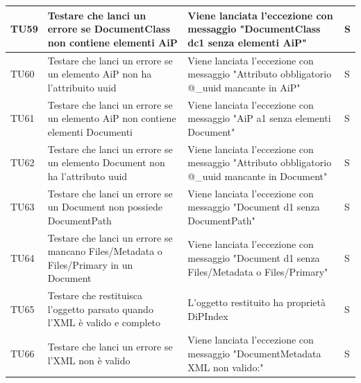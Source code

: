 \documentclass[a4paper,12pt]{article}
\begin{document}
\begin{longtable}{|M{1.2cm}|M{5cm}|M{8cm}|M{1.5cm}|}
            TU59 & Testare che \texttt{} lanci un errore se DocumentClass non contiene elementi AiP & Viene lanciata l'eccezione con messaggio "DocumentClass dc1 senza elementi AiP" & S \\
            \hline

            TU60 & Testare che \texttt{} lanci un errore se un elemento AiP non ha l'attribuito uuid & Viene lanciata l'eccezione con messaggio "Attributo obbligatorio @\_uuid mancante in AiP" & S \\
            \hline

            TU61 & Testare che \texttt{} lanci un errore se un elemento AiP non contiene elementi Documenti & Viene lanciata l'eccezione con messaggio "AiP a1 senza elementi Document" & S \\
            \hline

            TU62 & Testare che \texttt{} lanci un errore se un elemento Document non ha l'attributo uuid & Viene lanciata l'eccezione con messaggio "Attributo obbligatorio @\_uuid mancante in Document" & S \\
            \hline

            TU63 & Testare che \texttt{} lanci un errore se un Document non possiede DocumentPath & Viene lanciata l'eccezione con messaggio "Document d1 senza DocumentPath" & S \\
            \hline

            TU64 & Testare che \texttt{} lanci un errore se mancano Files/Metadata o Files/Primary in un Document & Viene lanciata l'eccezione con messaggio "Document d1 senza Files/Metadata o Files/Primary" & S \\
            \hline

            TU65 & Testare che \texttt{} restituisca l'oggetto parsato quando l'XML è valido e completo & L'oggetto restituito ha proprietà DiPIndex & S \\
            \hline
        
            TU66 & Testare che \texttt{} lanci un errore se l'XML non è valido & Viene lanciata l'eccezione con messaggio "DocumentMetadata XML non valido:" & S \\
            \hline


\end{longtable}
\end{document}

